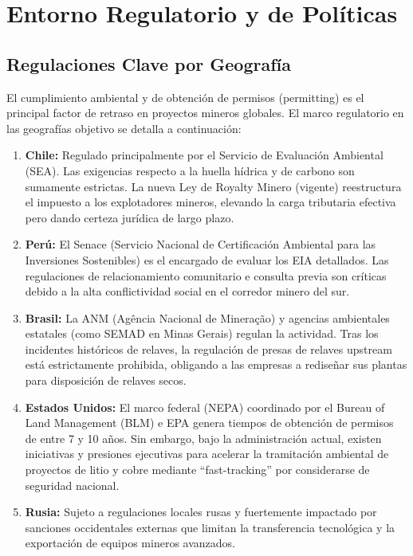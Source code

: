 \chapter{Entorno Regulatorio y de Políticas}

\section{Regulaciones Clave por Geografía}

El cumplimiento ambiental y de obtención de permisos (permitting) es el principal factor de retraso en proyectos mineros globales. El marco regulatorio en las geografías objetivo se detalla a continuación:

\begin{enumerate}
    \item \textbf{Chile:} Regulado principalmente por el Servicio de Evaluación Ambiental (SEA). Las exigencias respecto a la huella hídrica y de carbono son sumamente estrictas. La nueva Ley de Royalty Minero (vigente) reestructura el impuesto a los explotadores mineros, elevando la carga tributaria efectiva pero dando certeza jurídica de largo plazo.
    
    \item \textbf{Perú:} El Senace (Servicio Nacional de Certificación Ambiental para las Inversiones Sostenibles) es el encargado de evaluar los EIA detallados. Las regulaciones de relacionamiento comunitario e consulta previa son críticas debido a la alta conflictividad social en el corredor minero del sur.
    
    \item \textbf{Brasil:} La ANM (Agência Nacional de Mineração) y agencias ambientales estatales (como SEMAD en Minas Gerais) regulan la actividad. Tras los incidentes históricos de relaves, la regulación de presas de relaves upstream está estrictamente prohibida, obligando a las empresas a rediseñar sus plantas para disposición de relaves secos.
    
    \item \textbf{Estados Unidos:} El marco federal (NEPA) coordinado por el Bureau of Land Management (BLM) e EPA genera tiempos de obtención de permisos de entre 7 y 10 años. Sin embargo, bajo la administración actual, existen iniciativas y presiones ejecutivas para acelerar la tramitación ambiental de proyectos de litio y cobre mediante ``fast-tracking'' por considerarse de seguridad nacional.
    
    \item \textbf{Rusia:} Sujeto a regulaciones locales rusas y fuertemente impactado por sanciones occidentales externas que limitan la transferencia tecnológica y la exportación de equipos mineros avanzados.
\end{enumerate}

